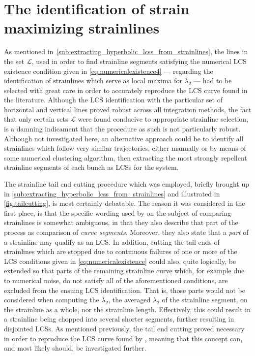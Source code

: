 \section{The identification of strain maximizing strainlines}
\label{sec:the_identification_of_strain_maximizing_strainlines}

As mentioned in~\cref{sub:extracting_hyperbolic_lcss_from_strainlines},
the lines in the set $\mathcal{L}$, used in order to find strainline segments
satisfying the numerical LCS existence condition given in
\cref{eq:numericalexistence4} --- regarding the identification of strainlines
which serve as local maxima for $\overline{\lambda}_{2}$ --- had to be selected
with great care in order to accurately reproduce the LCS curve found in the
literature. Although the LCS identification with the particular set of
horizontal and vertical lines proved robust across all integration methods, the
fact that only certain sets $\mathcal{L}$ were found conducive to appropriate
strainline selection, is a damning indicament that the procedure as such is not
particularly robust. Although not investigated here, an alternative approach
could be to identify all strainlines which follow very similar trajectories,
either manually or by means of some numerical clustering algorithm, then
extracting the most strongly repellent strainline segments of each bunch as
LCSs for the system.

The strainline tail end cutting procedure which was employed, briefly brought
up in
\cref{sub:extracting_hyperbolic_lcss_from_strainlines} and illustrated in
\cref{fig:tailcutting}, is most certainly debatable. The reason it was
considered in the first place, is that the specific wording used by
\textcite{farazmand2012computing} on the subject of comparing strainlines is
somewhat ambiguous, in that they also describe that part of the process as
comparison of \emph{curve segments}. Moreover, they also state that a
\emph{part} of a strainline may qualify as an LCS. In addition, cutting the
tail ends of strainlines which are stopped due to continuous failures of one
or more of the LCS conditions given in
\cref{eq:numericalexistence} could also, quite logically, be extended so that
parts of the remaining strainline curve which, for example due to numerical
noise, do not satisfy all of the aforementioned conditions, are excluded from
the ensuing LCS identification. That is, those parts would not be considered
when computing the $\overline{\lambda}_{2}$, the averaged $\lambda_{2}$ of
the strainline segment, on the strainline as a whole, nor
the strainline length. Effectively, this could result in a strainline being
chopped into several shorter segments, further resulting in
disjointed LCSs. As mentioned previously, the tail end cutting proved necessary
in order to reproduce the LCS curve found by \textcite{farazmand2012computing},
meaning that this concept can, and most likely should, be investigated further.

